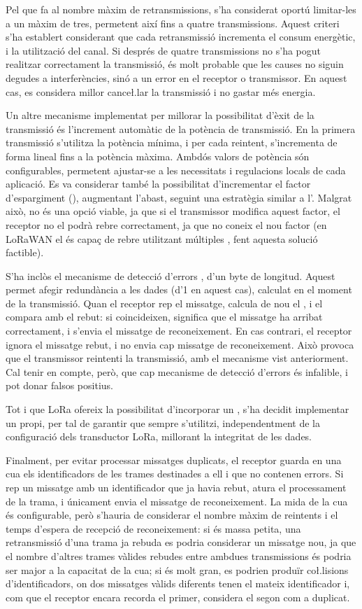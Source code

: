 \documentclass{tfgitic}[2024/07/01]
\begin{document}
Pel que fa al nombre màxim de retransmissions, s'ha considerat oportú limitar-les a un màxim de tres, permetent així fins a quatre transmissions. Aquest criteri s'ha establert considerant que cada retransmissió incrementa el consum energètic, i la utilització del canal. Si després de quatre transmissions no s'ha pogut realitzar correctament la transmissió, és molt probable que les causes no siguin degudes a interferències, sinó a un error en el receptor o transmissor. En aquest cas, es considera millor cance\l.lar la transmissió i no gastar més energia.

Un altre mecanisme implementat per millorar la possibilitat d'èxit de la transmissió és l'increment automàtic de la potència de transmissió. En la primera transmissió s'utilitza la potència mínima, i per cada reintent, s'incrementa de forma lineal fins a la potència màxima. Ambdós valors de potència són configurables, permetent ajustar-se a les necessitats i regulacions locals de cada aplicació. Es va considerar també la possibilitat d'incrementar el factor d'espargiment (), augmentant l'abast, seguint una estratègia similar a l'. Malgrat això, no és una opció viable, ja que si el transmissor modifica aquest factor, el receptor no el podrà rebre correctament, ja que no coneix el nou factor (en LoRaWAN el  és capaç de rebre utilitzant múltiples , fent aquesta solució factible). 

S'ha inclòs el mecanisme de detecció d'errors , d'un byte de longitud. Aquest permet afegir redundància a les dades (d'\SI{1}{\byte} en aquest cas), calculat en el moment de la transmissió. Quan el receptor rep el missatge, calcula de nou el , i el compara amb el rebut: si coincideixen, significa que el missatge ha arribat correctament, i s'envia el missatge de reconeixement. En cas contrari, el receptor ignora el missatge rebut, i no envia cap missatge de reconeixement. Això provoca que el transmissor reintenti la transmissió, amb el mecanisme vist anteriorment. Cal tenir en compte, però, que cap mecanisme de detecció d'errors és infalible, i pot donar falsos positius.  

Tot i que LoRa ofereix la possibilitat d'incorporar un , s'ha decidit implementar un  propi, per tal de garantir que sempre s'utilitzi, independentment de la configuració dels transductor LoRa, millorant la integritat de les dades. 

Finalment, per evitar processar missatges duplicats, el receptor guarda en una cua els identificadors de les trames destinades a ell i que no contenen errors. Si rep un missatge amb un identificador que ja havia rebut, atura el processament de la trama, i únicament envia el missatge de reconeixement. La mida de la cua és configurable, però s'hauria de considerar el nombre màxim de reintents i el temps d'espera de recepció de reconeixement: si és massa petita, una retransmissió d'una trama ja rebuda es podria considerar un missatge nou, ja que el nombre d'altres trames vàlides rebudes entre ambdues transmissions és podria ser major a la capacitat de la cua; si és molt gran, es podrien produïr co\l.lisions d'identificadors, on dos missatges vàlids diferents tenen el mateix identificador i, com que el receptor encara recorda el primer, considera el segon com a duplicat. 
\end{document}
